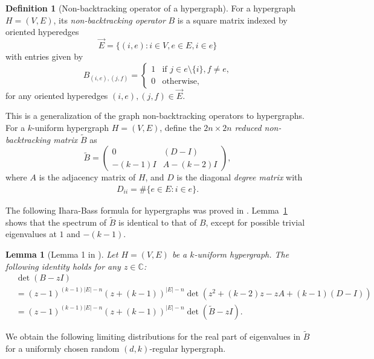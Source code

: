 \documentclass[11pt,reqno]{amsart}
\newtheorem{lemma}[theorem]{Lemma}
\theoremstyle{definition}
\newtheorem{definition}[theorem]{Definition}
\begin{document}
\begin{definition}[Non-backtracking operator of a  hypergraph]
   For a hypergraph $H=(V,E)$, its \textit{non-backtracking operator} $B$ is a square matrix indexed by oriented hyperedges 
\[\vec{E}=\{(i,e): i\in V, e\in E, i\in e\}\] with entries given by 
$$B_{(i, e), (j,f)}=\begin{cases}
	1 & \text{if $j\in e\setminus\{i\}, f\not=e$,}\\
	0 & \text{otherwise,}
\end{cases}
$$
for any oriented hyperedges $(i, e),(j, f)\in \vec{E}$.
\end{definition} 
 This is a generalization of the graph non-backtracking operators to hypergraphs. 
For a $k$-uniform hypergraph $H=(V,E)$, define the $2n \times 2n$ \textit{reduced non-backtracking matrix} $\tilde B$ as
\begin{equation}\label{eq:def_tilde_B}
\tilde B = \begin{pmatrix} 0 &  (D-I)\\  -(k-1)I & A-(k-2)I
\end{pmatrix},
\end{equation}
where $A$ is the adjacency matrix of $H$, and $D$ is the diagonal \textit{degree matrix} with
\begin{align} \label{eq:def_degree_matrix}
D_{ii} = \#\{e\in E:i\in e \}.
\end{align}

The following Ihara-Bass formula for hypergraphs was proved in \cite{stephan2022sparse}. Lemma~\ref{lem:Ihara-Bass_H} shows that the spectrum of $\tilde B$ is identical to that of $B$, except for possible trivial eigenvalues at ${1}$ and $-(k-1)$. 
\begin{lemma}[Lemma 1 in \cite{stephan2022sparse}]\label{lem:Ihara-Bass_H}
Let $H=(V,E)$ be a $k$-uniform hypergraph. The following identity holds for any $z\in \mathbb C$:
\begin{align*}
    &\det(B-zI)\\
    &=(z-1)^{(k-1)|E|-n}(z+(k-1))^{|E|-n}\det \left( z^2+(k-2)z-zA+(k-1)(D-I)\right)\\
    &=(z-1)^{(k-1)|E|-n}(z+(k-1))^{|E|-n}\det(\tilde B-zI).
\end{align*}
\end{lemma}


We obtain the following limiting distributions for the real part of eigenvalues in $\tilde B$ for a uniformly chosen random $(d,k)$-regular hypergraph.
\end{document}
